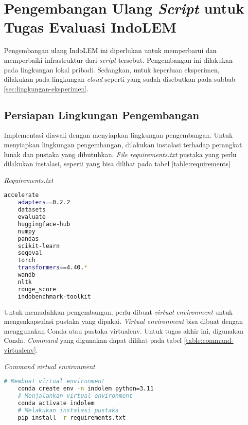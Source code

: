 \section{Pengembangan Ulang \textit{Script} untuk Tugas Evaluasi IndoLEM}
\label{sec:pengembangan-kakas}

Pengembangan ulang IndoLEM ini diperlukan untuk memperbarui dan memperbaiki infrastruktur dari \textit{script} tersebut. Pengembangan ini dilakukan pada lingkungan lokal pribadi. Sedangkan, untuk keperluan eksperimen, dilakukan pada lingkungan \textit{cloud} seperti yang sudah disebutkan pada subbab \ref{sec:lingkungan-eksperimen}.

\subsection{Persiapan Lingkungan Pengembangan}

Implementasi diawali dengan menyiapkan lingkungan pengembangan. Untuk menyiapkan lingkungan pengembangan, dilakukan instalasi terhadap perangkat lunak dan pustaka yang dibutuhkan. \textit{File requirements.txt} pustaka yang perlu dilakukan instalasi, seperti yang  bisa dilihat pada tabel \ref{table:requirements}

\begin{table}[h]
    \caption{\textit{Requirements.txt}}
    \label{table:requirements}
    \begin{lstlisting}[language=bash]
    accelerate
    adapters==0.2.2
    datasets
    evaluate
    huggingface-hub
    numpy
    pandas
    scikit-learn
    seqeval
    torch
    transformers==4.40.*
    wandb
    nltk
    rouge_score
    indobenchmark-toolkit
    \end{lstlisting}
\end{table}

Untuk memudahkan pengembangan, perlu dibuat \textit{virtual environment} untuk mengenkapsulasi pustaka yang dipakai. \textit{Virtual environment} bisa dibuat dengan menggunakan Conda atau pustaka virtualenv. Untuk tugas akhir ini, digunakan Conda. \textit{Command} yang digunakan dapat dilihat pada tabel \ref{table:command-virtualenv}.

\begin{table}[h]
    \caption{\textit{Command virtual environment}}
    \label{table:command-virtualenv}
    \begin{lstlisting}[language=bash]
    # Membuat virtual environment
    conda create env -n indolem python=3.11
    # Menjalankan virtual environment
    conda activate indolem
    # Melakukan instalasi pustaka 
    pip install -r requirements.txt
    \end{lstlisting}
\end{table}

